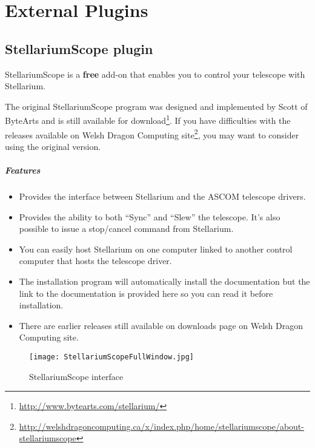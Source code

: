 
\chapter{External Plugins}

\section{StellariumScope plugin}
\label{sec:plugins:StellariumScope}
StellariumScope is a \textbf{free} add-on that enables you to control your telescope with Stellarium. 

The original StellariumScope program was designed and implemented by Scott of ByteArts and is still available for download\footnote{\url{http://www.bytearts.com/stellarium/}}. If you have difficulties with the releases available on Welsh Dragon Computing  site\footnote{\url{http://welshdragoncomputing.ca/x/index.php/home/stellariumscope/about-stellariumscope}}, you may want to consider using the original version.

\paragraph{Features}
\begin{itemize}
\item Provides the interface between Stellarium and the ASCOM telescope drivers.
\item Provides the ability to both ``Sync'' and ``Slew'' the telescope. It's also possible to issue a stop/cancel command from Stellarium.
\item You can easily host Stellarium on one computer linked to another control computer that hosts the telescope driver.
\item The installation program will automatically install the documentation but the link to the documentation is provided here so you can read it before installation.
\item There are earlier releases still available on downloads page on Welsh Dragon Computing  site.
\end{itemize}

\begin{figure}[h]
\begin{center}
\texttt{[image: StellariumScopeFullWindow.jpg]}
\end{center}
\label{fig:StellariumScopeFullWindow}
\caption{StellariumScope interface}
\end{figure}


